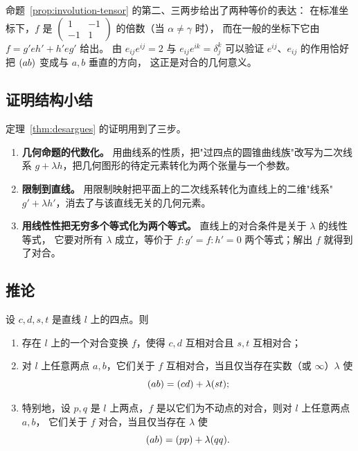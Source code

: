 \begin{remark}
命题~\ref{prop:involution-tensor} 的第二、三两步给出了两种等价的表达：
在标准坐标下，$f$ 是 $\begin{pmatrix}1&-1\\-1&1\end{pmatrix}$ 的倍数（当 $\alpha\neq\gamma$ 时），
而在一般的坐标下它由 $f=g'e h'+h'e g'$ 给出。
由 $e_{ij}e^{ij}=2$ 与 $e_{ij}e^{ik}=\delta^k_j$ 可以验证
$e^{ij}$、$e_{ij}$ 的作用恰好把 $(ab)$ 变成与 $a,b$ 垂直的方向，
这正是对合的几何意义。
\end{remark}

\subsection{证明结构小结}

定理~\ref{thm:desargues} 的证明用到了三步。

\begin{enumerate}
\item \textbf{几何命题的代数化。} 用曲线系的性质，把"过四点的圆锥曲线族"改写为二次线系
$g+\lambda h$，把几何图形的待定元素转化为两个张量与一个参数。
\item \textbf{限制到直线。} 用限制映射把平面上的二次线系转化为直线上的二维"线系"
$g'+\lambda h'$，消去了与该直线无关的几何元素。
\item \textbf{用线性性把无穷多个等式化为两个等式。} 直线上的对合条件是关于 $\lambda$ 的线性等式，
它要对所有 $\lambda$ 成立，等价于 $f:g'=f:h'=0$ 两个等式；解出 $f$ 就得到了对合。
\end{enumerate}

\subsection{推论}

\begin{corollary}[直线上的对合]\label{cor:line-involution}
设 $c,d,s,t$ 是直线 $l$ 上的四点。则
\begin{enumerate}
\item 存在 $l$ 上的一个对合变换 $f$，使得 $c,d$ 互相对合且 $s,t$ 互相对合；
\item 对 $l$ 上任意两点 $a,b$，它们关于 $f$ 互相对合，当且仅当存在实数（或 $\infty$）$\lambda$ 使
\[
(ab)=(cd)+\lambda(st) ;
\]
\item 特别地，设 $p,q$ 是 $l$ 上两点，$f$ 是以它们为不动点的对合，则对 $l$ 上任意两点 $a,b$，
它们关于 $f$ 对合，当且仅当存在 $\lambda$ 使
\[
(ab)=(pp)+\lambda(qq) .
\]
\end{enumerate}
\end{corollary}


